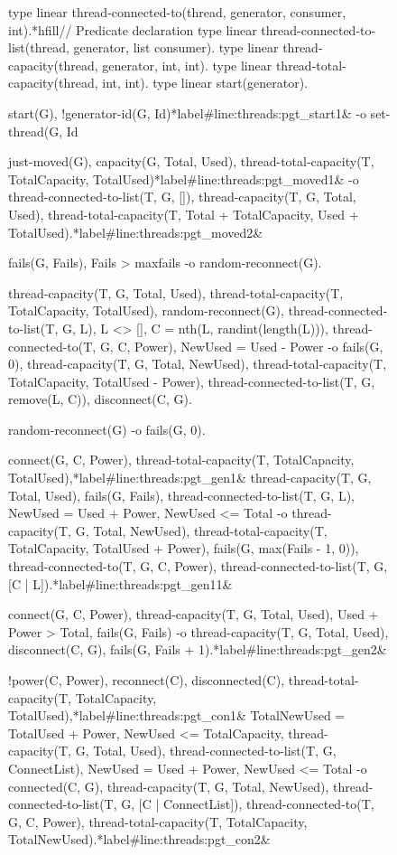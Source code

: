 \begin{figure}[h!]
\begin{LineCode}[fontsize=\scriptsize,commandchars=*\#\&]
type linear thread-connected-to(thread, generator, consumer, int).*hfill// Predicate declaration
type linear thread-connected-to-list(thread, generator, list consumer).
type linear thread-capacity(thread, generator, int, int).
type linear thread-total-capacity(thread, int, int).
type linear start(generator).

start(G), !generator-id(G, Id)*label#line:threads:pgt_start1&
   -o set-thread(G, Id %

just-moved(G), capacity(G, Total, Used), thread-total-capacity(T, TotalCapacity, TotalUsed)*label#line:threads:pgt_moved1&
   -o thread-connected-to-list(T, G, []), thread-capacity(T, G, Total, Used),
      thread-total-capacity(T, Total + TotalCapacity, Used + TotalUsed).*label#line:threads:pgt_moved2&

fails(G, Fails), Fails > maxfails
   -o random-reconnect(G).

thread-capacity(T, G, Total, Used), thread-total-capacity(T, TotalCapacity, TotalUsed),
random-reconnect(G), thread-connected-to-list(T, G, L), L <> [], C = nth(L, randint(length(L))),
thread-connected-to(T, G, C, Power), NewUsed = Used - Power
   -o fails(G, 0), thread-capacity(T, G, Total, NewUsed),
      thread-total-capacity(T, TotalCapacity, TotalUsed - Power),
      thread-connected-to-list(T, G, remove(L, C)), disconnect(C, G).

random-reconnect(G) -o fails(G, 0).

connect(G, C, Power), thread-total-capacity(T, TotalCapacity, TotalUsed),*label#line:threads:pgt_gen1&
thread-capacity(T, G, Total, Used), fails(G, Fails), thread-connected-to-list(T, G, L),
NewUsed = Used + Power, NewUsed <= Total
   -o thread-capacity(T, G, Total, NewUsed),
      thread-total-capacity(T, TotalCapacity, TotalUsed + Power),
      fails(G, max(Fails - 1, 0)), thread-connected-to(T, G, C, Power),
      thread-connected-to-list(T, G, [C | L]).*label#line:threads:pgt_gen11&

connect(G, C, Power), thread-capacity(T, G, Total, Used), Used + Power > Total, fails(G, Fails)
   -o thread-capacity(T, G, Total, Used), disconnect(C, G), fails(G, Fails + 1).*label#line:threads:pgt_gen2&

!power(C, Power), reconnect(C), disconnected(C), thread-total-capacity(T, TotalCapacity, TotalUsed),*label#line:threads:pgt_con1&
TotalNewUsed = TotalUsed + Power, NewUsed <= TotalCapacity,
thread-capacity(T, G, Total, Used), thread-connected-to-list(T, G, ConnectList),
NewUsed = Used + Power, NewUsed <= Total
   -o connected(C, G), thread-capacity(T, G, Total, NewUsed),
      thread-connected-to-list(T, G, [C | ConnectList]), thread-connected-to(T, G, C, Power),
      thread-total-capacity(T, TotalCapacity, TotalNewUsed).*label#line:threads:pgt_con2&


\end{LineCode}
\end{figure}
